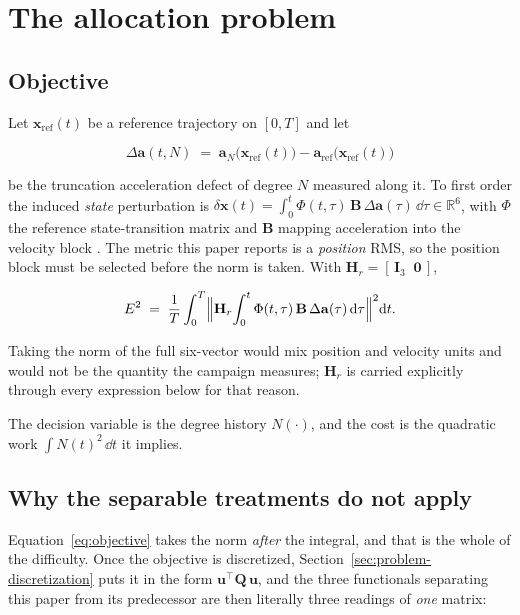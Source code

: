 \section{The allocation problem}
\label{sec:problem}

\subsection{Objective}

Let $\mathbf x_{\mathrm{ref}}(t)$ be a reference trajectory on $[0,T]$ and let

\begin{equation}
  \Delta\mathbf a(t,N) \;=\;
  \mathbf a_N\bigl(\mathbf x_{\mathrm{ref}}(t)\bigr)
  -\mathbf a_{\mathrm{ref}}\bigl(\mathbf x_{\mathrm{ref}}(t)\bigr)
  \label{eq:defect}
\end{equation}

be the truncation acceleration defect of degree $N$ measured along it. To first
order the induced \emph{state} perturbation is
$\delta\mathbf x(t)=\int_0^t \Phi(t,\tau)\,\mathbf B\,\Delta\mathbf a(\tau)\,\dd\tau
\in\mathbb{R}^6$, with $\Phi$ the reference state-transition matrix and
$\mathbf B$ mapping acceleration into the velocity block
\citep[Ch.~4]{tapley2004statistical}. The metric this paper reports is a
\emph{position} RMS, so the position block must be selected before the norm is
taken. With $\mathbf H_r=[\,\mathbf I_3\;\;\mathbf 0\,]$,

\begin{equation}
  E^2 \;=\; \frac{1}{T}\int_0^{T}
  \Bigl\lVert \mathbf H_r\!\int_0^{t}\Phi(t,\tau)\,\mathbf B\,
  \Delta\mathbf a(\tau)\,\mathrm{d}\tau \Bigr\rVert^2 \mathrm{d} t .
  \label{eq:objective}
\end{equation}

Taking the norm of the full six-vector would mix position and velocity units
and would not be the quantity the campaign measures; $\mathbf H_r$ is carried
explicitly through every expression below for that reason.

The decision variable is the degree history $N(\cdot)$, and the cost is the
quadratic work $\int N(t)^2\,\dd t$ it implies.

\subsection{Why the separable treatments do not apply}

Equation~\eqref{eq:objective} takes the norm \emph{after} the integral, and
that is the whole of the difficulty. Once the objective is discretized, Section~\ref{sec:problem-discretization}
puts it in the form $\mathbf u^{\top}\mathbf Q\,\mathbf u$, and the three
functionals separating this paper from its predecessor are then literally three
readings of \emph{one} matrix:

